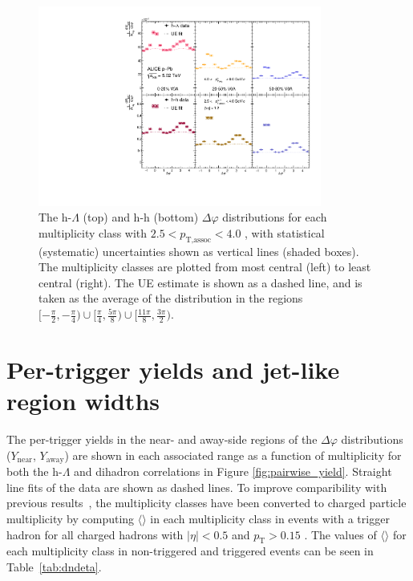 \begin{figure}[h!]
\centering
\includegraphics[width=0.83\textwidth]{figures/results/dphi_final_highpt.pdf}
\caption{The h-$\Lambda$ (top) and h-h (bottom) $\Delta\varphi$ distributions for each multiplicity class with $2.5 < p_{\text{T,assoc}} < 4.0$ \GeVc, with statistical (systematic) uncertainties shown as vertical lines (shaded boxes). The multiplicity classes are plotted from most central (left) to least central (right). The UE estimate is shown as a dashed line, and is taken as the average of the distribution in the regions $[-\frac{\pi}{2}, -\frac{\pi}{4}) \cup [\frac{\pi}{4}, \frac{5\pi}{8}) \cup [\frac{11\pi}{8}, \frac{3\pi}{2})$.}
\label{fig:dphi_final_highpt}
\end{figure}

\section{Per-trigger yields and jet-like region widths}

The per-trigger yields in the near- and away-side regions of the $\Delta\varphi$ distributions ($Y_{\text{near}}$, $Y_{\text{away}}$) are shown in each associated \pt range as a function of multiplicity for both the h-$\Lambda$ and dihadron correlations in Figure \ref{fig:pairwise_yield}. Straight line fits of the data are shown as dashed lines. To improve comparibility with previous results~\cite{ALICEpPbEnhancement,ALICEppEnhancement}, the multiplicity classes have been converted to charged particle multiplicity by computing $\langle$\dndeta$\rangle$ in each multiplicity class in events with a trigger hadron for all charged hadrons with $|\eta| < 0.5$ and $p_{\text{T}} > 0.15$ \GeVc. The values of $\langle$\dndeta$\rangle$ for each multiplicity class in non-triggered and triggered events can be seen in Table~\ref{tab:dndeta}. 

